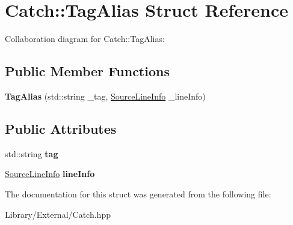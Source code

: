 \hypertarget{struct_catch_1_1_tag_alias}{}\section{Catch\+:\+:Tag\+Alias Struct Reference}
\label{struct_catch_1_1_tag_alias}


Collaboration diagram for Catch\+:\+:Tag\+Alias\+:
\subsection*{Public Member Functions}
\begin{DoxyCompactItemize}
\item 
\hypertarget{struct_catch_1_1_tag_alias_ad9124d03bfb6f767f1c97572330b05bc}{}{\bfseries Tag\+Alias} (std\+::string \+\_\+tag, \hyperlink{struct_catch_1_1_source_line_info}{Source\+Line\+Info} \+\_\+line\+Info)\label{struct_catch_1_1_tag_alias_ad9124d03bfb6f767f1c97572330b05bc}

\end{DoxyCompactItemize}
\subsection*{Public Attributes}
\begin{DoxyCompactItemize}
\item 
\hypertarget{struct_catch_1_1_tag_alias_a950183883ab17c90d0fab16b966b6e2d}{}std\+::string {\bfseries tag}\label{struct_catch_1_1_tag_alias_a950183883ab17c90d0fab16b966b6e2d}

\item 
\hypertarget{struct_catch_1_1_tag_alias_a2f51fe0b3c052561275d26b6eb88f702}{}\hyperlink{struct_catch_1_1_source_line_info}{Source\+Line\+Info} {\bfseries line\+Info}\label{struct_catch_1_1_tag_alias_a2f51fe0b3c052561275d26b6eb88f702}

\end{DoxyCompactItemize}


The documentation for this struct was generated from the following file\+:\begin{DoxyCompactItemize}
\item 
Library/\+External/Catch.\+hpp\end{DoxyCompactItemize}
